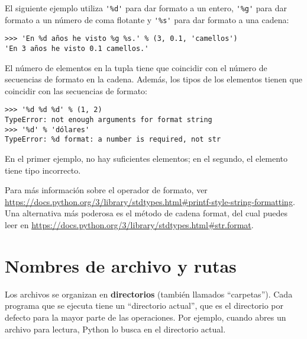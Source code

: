\documentclass[10pt]{book}
\begin{document}
El siguiente ejemplo utiliza \verb"'%d'" para dar formato a un entero,
\verb"'%g'" para dar formato a un número de coma flotante y
\verb"'%s'" para dar formato a una cadena:

\begin{verbatim}
>>> 'En %d años he visto %g %s.' % (3, 0.1, 'camellos')
'En 3 años he visto 0.1 camellos.'
\end{verbatim}
%
El número de elementos en la tupla tiene que coincidir con el número
de secuencias de formato en la cadena.  Además, los tipos de los
elementos tienen que coincidir con las secuencias de formato:

\begin{verbatim}
>>> '%d %d %d' % (1, 2)
TypeError: not enough arguments for format string
>>> '%d' % 'dólares'
TypeError: %d format: a number is required, not str
\end{verbatim}
%
En el primer ejemplo, no hay suficientes elementos; en el
segundo, el elemento tiene tipo incorrecto.

Para más información sobre el operador de formato, ver
\url{https://docs.python.org/3/library/stdtypes.html#printf-style-string-formatting}.  Una alternativa más poderosa es
el método de cadena format, del cual puedes leer en
\url{https://docs.python.org/3/library/stdtypes.html#str.format}.




\section{Nombres de archivo y rutas}
\label{paths}

Los archivos se organizan en {\bf directorios} (también llamados ``carpetas'').
Cada programa que se ejecuta tiene un ``directorio actual'', que es el
directorio por defecto para la mayor parte de las operaciones.
Por ejemplo, cuando abres un archivo para lectura, Python lo busca en el
directorio actual.
\end{document}
